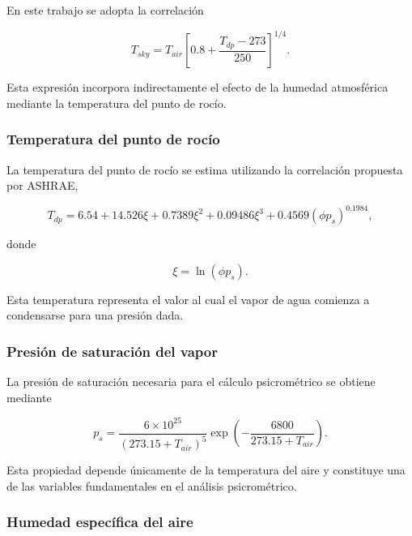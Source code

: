 En este trabajo se adopta la correlación

\begin{equation}
T_{sky}
=
T_{air}
\left[
0.8+
\frac{T_{dp}-273}{250}
\right]^{1/4}.
\end{equation}

Esta expresión incorpora indirectamente el efecto de la humedad atmosférica mediante la temperatura del punto de rocío.

\subsubsection{Temperatura del punto de rocío}

La temperatura del punto de rocío se estima utilizando la correlación propuesta por ASHRAE,

\begin{equation}
T_{dp}
=
6.54
+
14.526\xi
+
0.7389\xi^2
+
0.09486\xi^3
+
0.4569(\phi p_s)^{0.1984},
\end{equation}

donde

\[
\xi
=
\ln(\phi p_s).
\]

Esta temperatura representa el valor al cual el vapor de agua comienza a condensarse para una presión dada.

\subsubsection{Presión de saturación del vapor}

La presión de saturación necesaria para el cálculo psicrométrico se obtiene mediante

\begin{equation}
p_s
=
\frac
{6\times10^{25}}
{(273.15+T_{air})^5}
\exp
\left(
-\frac{6800}{273.15+T_{air}}
\right).
\end{equation}

Esta propiedad depende únicamente de la temperatura del aire y constituye una de las variables fundamentales en el análisis psicrométrico.

\subsubsection{Humedad específica del aire}

